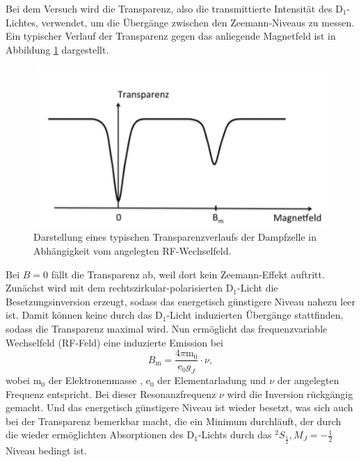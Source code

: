 Bei dem Versuch wird die Transparenz, also die transmittierte Intensität
des D$_1$-Lichtes, verwendet, um die Übergänge zwischen den Zeemann-Niveaus
zu messen.
Ein typischer Verlauf der Transparenz gegen das anliegende Magnetfeld
ist in Abbildung \ref{fig:transparenz} dargestellt.
\begin{figure}
  \centering
  \includegraphics[width=0.9\columnwidth]{pictures/transparenz.png}
  \caption{Darstellung eines typischen Transparenzverlaufs der Dampfzelle in Abhängigkeit vom angelegten RF-Wechselfeld. \cite{Anleitung}}
  \label{fig:transparenz}
\end{figure}
Bei $B=0$ fällt die Transparenz ab, weil dort
kein Zeemann-Effekt auftritt.
Zunächst wird mit dem rechtszirkular-polarisierten D$_1$-Licht die Besetzungsinversion erzeugt, sodass
das energetisch günstigere Niveau nahezu leer ist. Damit können keine
durch das D$_1$-Licht induzierten Übergänge stattfinden, sodass die
Transparenz maximal wird. Nun ermöglicht das frequenzvariable
Wechselfeld (RF-Feld) eine induzierte Emission bei
\begin{equation}
	\label{eqn:g_f}
	B_{\mathrm{m}} = \frac{4\pi \mathrm{m}_0}{\mathrm{e}_0 g_J}\cdot \nu \mathrm{,}
\end{equation}
wobei $\mathrm{m}_0$ der Elektronenmasse \cite{m_0}, $\mathrm{e}_0$ der
Elementarladung \cite{e} und $\nu$ der angelegten Frequenz entspricht.
Bei dieser Resonanzfrequenz $\nu$ wird die Inversion rückgängig gemacht.
Und das energetisch günstigere Niveau ist wieder besetzt, was sich auch
bei der Transparenz bemerkbar macht, die ein Minimum durchläuft, der durch die wieder
ermöglichten Absorptionen des D$_1$-Lichts durch das
$^2S_{\frac{1}{2}}, M_J = -\frac{1}{2}$ Niveau bedingt ist.
